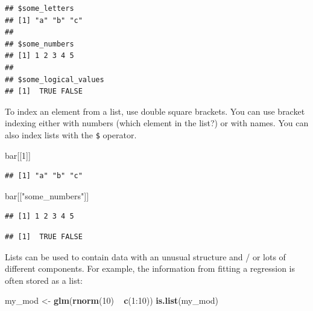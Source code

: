 \documentclass[]{book}
\makeatletter
\newenvironment{Shaded}{\begin{snugshade}}{\end{snugshade}}
\newcommand{\KeywordTok}[1]{\textcolor[rgb]{0.13,0.29,0.53}{\textbf{{#1}}}}
\newcommand{\DecValTok}[1]{\textcolor[rgb]{0.00,0.00,0.81}{{#1}}}
\newcommand{\StringTok}[1]{\textcolor[rgb]{0.31,0.60,0.02}{{#1}}}
\newcommand{\NormalTok}[1]{{#1}}
\newenvironment{kframe}{%
\medskip{}
\setlength{\fboxsep}{.8em}
 \def\at@end@of@kframe{}%
 \ifinner\ifhmode%
  \def\at@end@of@kframe{\end{minipage}}%
  \begin{minipage}{\columnwidth}%
 \fi\fi%
 \def\FrameCommand##1{\hskip\@totalleftmargin \hskip-\fboxsep
 \colorbox{shadecolor}{##1}\hskip-\fboxsep
     \hskip-\linewidth \hskip-\@totalleftmargin \hskip\columnwidth}%
 \MakeFramed {\advance\hsize-\width
   \@totalleftmargin\z@ \linewidth\hsize
   \@setminipage}}%
 {\par\unskip\endMakeFramed%
 \at@end@of@kframe}
\renewenvironment{Shaded}{\begin{kframe}}{\end{kframe}}
\makeatother
\begin{document}
\begin{verbatim}
## $some_letters
## [1] "a" "b" "c"
## 
## $some_numbers
## [1] 1 2 3 4 5
## 
## $some_logical_values
## [1]  TRUE FALSE
\end{verbatim}

To index an element from a list, use double square brackets. You can use
bracket indexing either with numbers (which element in the list?) or
with names. You can also index lists with the \texttt{\$} operator.

\begin{Shaded}
\begin{Highlighting}[]
\NormalTok{bar[[}\DecValTok{1}\NormalTok{]]}
\end{Highlighting}
\end{Shaded}

\begin{verbatim}
## [1] "a" "b" "c"
\end{verbatim}

\begin{Shaded}
\begin{Highlighting}[]
\NormalTok{bar[[}\StringTok{"some_numbers"}\NormalTok{]]}
\end{Highlighting}
\end{Shaded}

\begin{verbatim}
## [1] 1 2 3 4 5
\end{verbatim}

\begin{Shaded}
\end{Shaded}

\begin{verbatim}
## [1]  TRUE FALSE
\end{verbatim}

Lists can be used to contain data with an unusual structure and / or
lots of different components. For example, the information from fitting
a regression is often stored as a list:

\begin{Shaded}
\begin{Highlighting}[]
\NormalTok{my_mod <-}\StringTok{ }\KeywordTok{glm}\NormalTok{(}\KeywordTok{rnorm}\NormalTok{(}\DecValTok{10}\NormalTok{) ~}\StringTok{ }\KeywordTok{c}\NormalTok{(}\DecValTok{1}\NormalTok{:}\DecValTok{10}\NormalTok{))}
\KeywordTok{is.list}\NormalTok{(my_mod)}
\end{Highlighting}
\end{Shaded}
\end{document}

